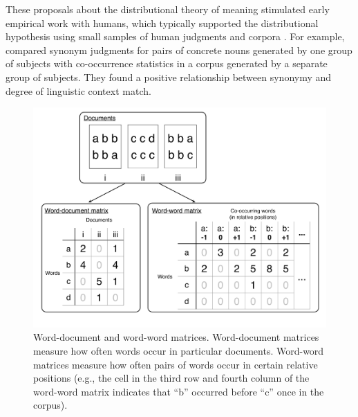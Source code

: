 \documentclass[man,longtable, floatmark]{my-apa6}
\begin{document}
These proposals about the distributional theory of meaning stimulated early empirical work with humans, which typically supported the distributional hypothesis using small samples of human judgments and corpora \citep{rubenstein1965, clark1968, stefflre1971, geffroy1973, berryrogghe1973, szalay1974}. For example, \citet{rubenstein1965} compared synonym judgments for pairs of concrete nouns generated by one group of subjects with co-occurrence statistics in a corpus generated by a separate group of subjects. They found a positive relationship between synonymy and degree of linguistic context match.

\begin{figure}[t]
  \begin{center}
    \includegraphics[width=0.9\linewidth]{matrices}
  \end{center}
  \caption{Word-document and word-word matrices. Word-document matrices measure how often words occur in particular documents. Word-word matrices measure how often pairs of words occur in certain relative positions (e.g., the cell in the third row and fourth column of the word-word matrix indicates that ``b'' occurred before ``c'' once in the corpus).}
  \label{matrices}
\end{figure}
\end{document}
